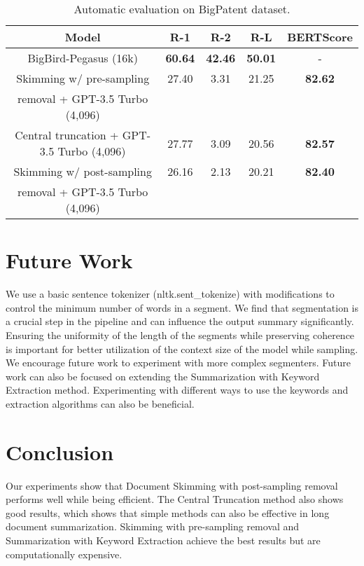 \documentclass[letterpaper]{article} %
\begin{document}
  \begin{table}[!ht]
    \centering
    \tiny

    \begin{tabular}{c c c c c}
      \hline
      Model & R-1 & R-2 & R-L & BERTScore \\
      \hline
      BigBird-Pegasus (16k) & \textbf{60.64} & \textbf{42.46} & \textbf{50.01} & - \\
      \hline
      Skimming w/ pre-sampling & 27.40 & 3.31 & 21.25 & \textbf{82.62} \\
      removal + GPT-3.5 Turbo (4,096) & & & & \\
      Central truncation + GPT-3.5 Turbo (4,096) & 27.77 & 3.09 & 20.56 & \textbf{82.57} \\
      Skimming w/ post-sampling & 26.16 & 2.13 & 20.21 & \textbf{82.40} \\
      removal + GPT-3.5 Turbo (4,096) & & & & \\
      \hline
    \end{tabular}

    \caption{Automatic evaluation on BigPatent dataset.}
    \label{tab:bigpatent}
  \end{table}


\section{Future Work}

  We use a basic sentence tokenizer (nltk.sent\_tokenize) with modifications to control
  the minimum number of words in a segment.
  We find that segmentation is a crucial step in the pipeline and can influence the output
  summary significantly.
  Ensuring the uniformity of the length of the segments while preserving coherence is
  important for better utilization of the context size of the model while sampling.
  We encourage future work to experiment with more complex segmenters.
  Future work can also be focused on extending the Summarization with Keyword Extraction method.
  Experimenting with different ways to use the keywords and extraction algorithms can also be
  beneficial.


\section{Conclusion}

  Our experiments show that Document Skimming with post-sampling removal performs well while
  being efficient.
  The Central Truncation method also shows good results, which shows that simple methods can
  also be effective in long document summarization.
  Skimming with pre-sampling removal and Summarization with Keyword Extraction achieve the best
  results but are computationally expensive.
\end{document}
